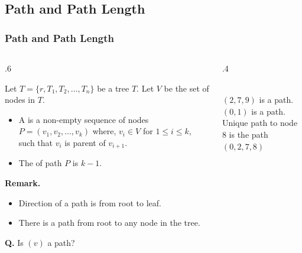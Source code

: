 \documentclass[10pt]{beamer}
\begin{document}
\subsection{Path and Path Length}
\begin{frame}[t]\frametitle{Path and Path Length}
	\begin{columns}[T] %
	\begin{column}{.6\linewidth} %
	{\footnotesize 
		\begin{definition}
			Let $T = \{ r, T_{1}, T_{2}, \ldots, T_{n} \}$ be a tree $T$.					    
			Let  $V$ be the set of nodes in  $T$.

			\begin{itemize}
				
				\item 
				A  is a non-empty sequence of nodes 
				$P = ( v_{1}, v_{2}, \dotsc, v_{k} )$
				where,  $v_{i} \in V$ for $1 \le i \le k$,
				such that $v_{i}$ is parent of $v_{i + 1}$.
				
				\item 
				The  of path $P$ is $k - 1$.
				
			\end{itemize}
		\end{definition}	
		
		\textbf{Remark.}
		\begin{itemize}
			
			\item 
			Direction of a path is from root to leaf.
			
			\item 
			There is a  path from root to any node in the tree.			
		\end{itemize}
		
		\textbf{Q.}
		Is $(v)$ a path?
	} %
	\end{column} %
	\begin{column}{.4\linewidth} %
		\begin{example}
		{\scriptsize
%			
			
			\\
			$(2, 7, 9)$ is a path.\\
			$(0,1)$ is a path.\\
			Unique path to node $8$ is the path $(0, 2, 7, 8)$\\
		} %
		\end{example}
	\end{column} %
	\end{columns} %
\end{frame}
\end{document}
